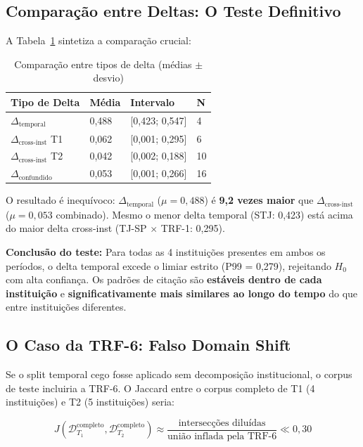 \documentclass[12pt,a4paper]{article}
\theoremstyle{remark}
\begin{document}
\subsection{Comparação entre Deltas: O Teste Definitivo}

A Tabela~\ref{tab:comparacao} sintetiza a comparação crucial:

\begin{table}[H]\centering\footnotesize
\caption{Comparação entre tipos de delta (médias $\pm$ desvio)}
\label{tab:comparacao}
\begin{tabular}{p{}p{}p{}p{}}
\toprule
\textbf{Tipo de Delta} & \textbf{Média} & \textbf{Intervalo} & \textbf{N} \\
\midrule
$\Delta_{\text{temporal}}$ & 0,488 & [0,423; 0,547] & 4 \\
$\Delta_{\text{cross-inst}}$ T1 & 0,062 & [0,001; 0,295] & 6 \\
$\Delta_{\text{cross-inst}}$ T2 & 0,042 & [0,002; 0,188] & 10 \\
$\Delta_{\text{confundido}}$ & 0,053 & [0,001; 0,266] & 16 \\
\bottomrule
\end{tabular}
\end{table}

O resultado é inequívoco: $\Delta_{\text{temporal}}$ ($\mu = 0,488$) é \textbf{9,2 vezes maior} que $\Delta_{\text{cross-inst}}$ ($\mu = 0,053$ combinado). Mesmo o menor delta temporal (STJ: 0,423) está acima do maior delta cross-inst (TJ-SP $\times$ TRF-1: 0,295).

\textbf{Conclusão do teste:} Para todas as 4 instituições presentes em ambos os períodos, o delta temporal excede o limiar estrito (P99 = 0,279), rejeitando $H_0$ com alta confiança. Os padrões de citação são \textbf{estáveis dentro de cada instituição} e \textbf{significativamente mais similares ao longo do tempo} do que entre instituições diferentes.

\subsection{O Caso da TRF-6: Falso Domain Shift}

Se o split temporal cego fosse aplicado sem decomposição institucional, o corpus de teste incluiria a TRF-6. O Jaccard entre o corpus completo de T1 (4 instituições) e T2 (5 instituições) seria:

\begin{equation}
J(\mathcal{D}_{T_1}^{\text{completo}}, \mathcal{D}_{T_2}^{\text{completo}}) \approx \frac{\text{intersecções diluídas}}{\text{união inflada pela TRF-6}} \ll 0,30
\end{equation}
\end{document}
